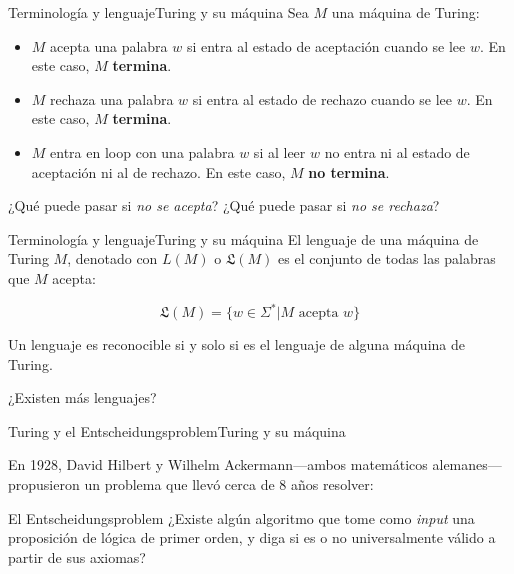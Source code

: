 \documentclass[spanish, handout]{beamer}
\begin{document}
\begin{frame}{Terminología y lenguaje}{Turing y su máquina}
    Sea $M$ una máquina de Turing:

    \bigskip

    \begin{itemize}
        \itemsep1.5ex
        \item $M$ \alert{acepta} una palabra $w$ si entra al estado de aceptación cuando se lee $w$. En este caso, $M$ \textbf{termina}. \pause
        \item $M$ \alert{rechaza} una palabra $w$ si entra al estado de rechazo cuando se lee $w$. En este caso, $M$ \textbf{termina}. \pause
        \item $M$ entra en \alert{loop} con una palabra $w$ si al leer $w$ no entra ni al estado de aceptación ni al de rechazo. En este caso, $M$ \textbf{no termina}. \pause
    \end{itemize}

    ¿Qué puede pasar si \textit{no se acepta}? \pause ¿Qué puede pasar si \textit{no se rechaza}?
\end{frame}

\begin{frame}{Terminología y lenguaje}{Turing y su máquina}
    El lenguaje de una máquina de Turing $M$, denotado con $L(M)$ o $\mathfrak{L}(M)$ es el conjunto de todas las palabras que $M$ acepta: \pause

    $$\mathfrak{L}(M) = \{w \in \Sigma^* | M \text{ acepta } w\}$$

    Un lenguaje es \alert{reconocible} si y solo si es el lenguaje de alguna máquina de Turing. \pause

    \bigskip
    
    ¿Existen más lenguajes?
    
\end{frame}

\begin{frame}{Turing y el Entscheidungsproblem}{Turing y su máquina}

    En 1928, David Hilbert y Wilhelm Ackermann---ambos matemáticos alemanes---propusieron un problema que llevó cerca de 8 años resolver: \pause

    \bigskip
    
    \begin{block}{El Entscheidungsproblem}
        ¿Existe algún algoritmo que tome como \textit{input} una proposición de lógica de primer orden, y diga si es o no universalmente válido a partir de sus axiomas?
    \end{block}
    
\end{frame}
\end{document}
